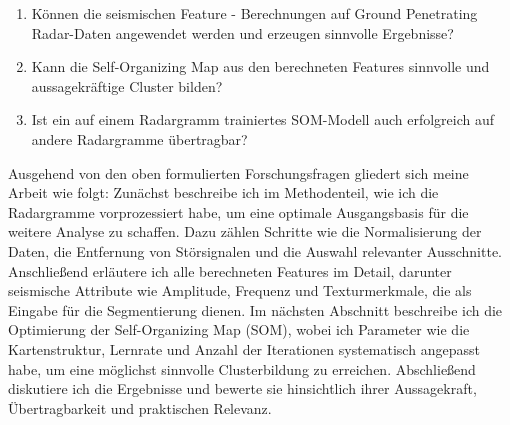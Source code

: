 \begin{enumerate}
    \item Können die seismischen Feature - Berechnungen auf Ground Penetrating Radar-Daten angewendet werden und erzeugen sinnvolle Ergebnisse?
    \item Kann die Self-Organizing Map aus den berechneten Features sinnvolle und aussagekräftige Cluster bilden?
    \item Ist ein auf einem Radargramm trainiertes SOM-Modell auch erfolgreich auf andere Radargramme übertragbar?
\end{enumerate}
Ausgehend von den oben formulierten Forschungsfragen gliedert sich meine Arbeit wie folgt: Zunächst beschreibe ich im Methodenteil, wie ich die Radargramme vorprozessiert habe, um eine optimale Ausgangsbasis für die weitere Analyse zu schaffen. Dazu zählen Schritte wie die Normalisierung der Daten, die Entfernung von Störsignalen und die Auswahl relevanter Ausschnitte. Anschließend erläutere ich alle berechneten Features im Detail, darunter seismische Attribute wie Amplitude, Frequenz und Texturmerkmale, die als Eingabe für die Segmentierung dienen. Im nächsten Abschnitt beschreibe ich die Optimierung der Self-Organizing Map (SOM), wobei ich Parameter wie die Kartenstruktur, Lernrate und Anzahl der Iterationen systematisch angepasst habe, um eine möglichst sinnvolle Clusterbildung zu erreichen. Abschließend diskutiere ich die Ergebnisse und bewerte sie hinsichtlich ihrer Aussagekraft, Übertragbarkeit und praktischen Relevanz.